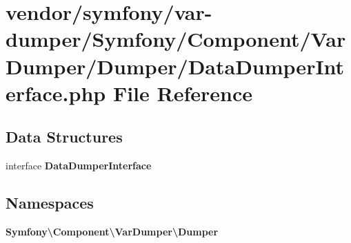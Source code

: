 \section{vendor/symfony/var-\/dumper/\+Symfony/\+Component/\+Var\+Dumper/\+Dumper/\+Data\+Dumper\+Interface.php File Reference}
\label{_data_dumper_interface_8php}
\subsection*{Data Structures}
\begin{DoxyCompactItemize}
\item 
interface {\bf Data\+Dumper\+Interface}
\end{DoxyCompactItemize}
\subsection*{Namespaces}
\begin{DoxyCompactItemize}
\item 
 {\bf Symfony\textbackslash{}\+Component\textbackslash{}\+Var\+Dumper\textbackslash{}\+Dumper}
\end{DoxyCompactItemize}

